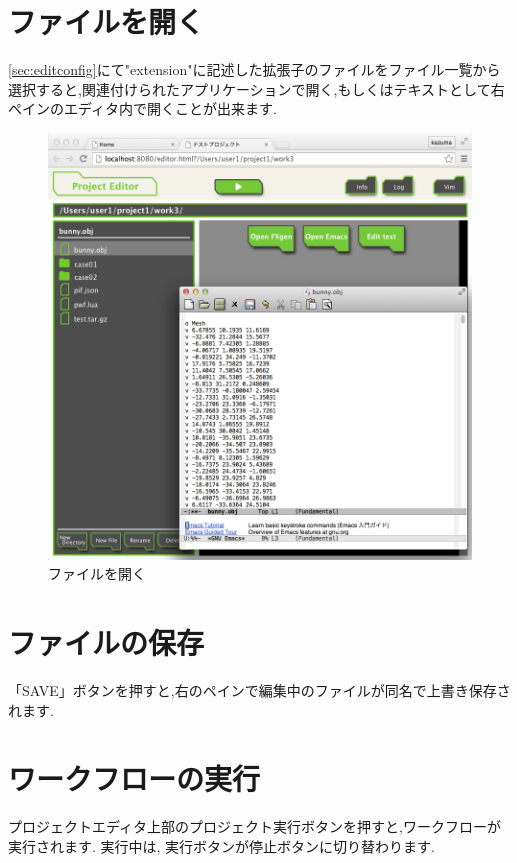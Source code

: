 \documentclass[a4paper,10pt,oneside]{jsbook}
\begin{document}
\newpage

\section{ファイルを開く}
\ref{sec:editconfig}にて"extension"に記述した拡張子のファイルをファイル一覧から選択すると,関連付けられたアプリケーションで開く,もしくはテキストとして右ペインのエディタ内で開くことが出来ます.

\begin{figure}[htbp]
	\begin{center}
		\includegraphics[width=12.0cm]{image/launch_button_003.png}
	\end{center}
	\caption{ファイルを開く}
	\label{fig:projeditor_edit}
\end{figure}

\section{ファイルの保存}
「SAVE」ボタンを押すと,右のペインで編集中のファイルが同名で上書き保存されます.

\section{ワークフローの実行}
プロジェクトエディタ上部のプロジェクト実行ボタンを押すと,ワークフローが実行されます. 実行中は, 実行ボタンが停止ボタンに切り替わります.
\end{document}
